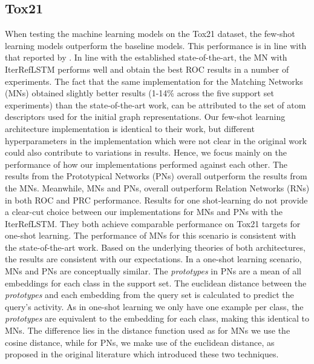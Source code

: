 \documentclass[journal=acscii,manuscript=article]{achemso}
\begin{document}
\subsection{Tox21}

When testing the machine learning models on the Tox21 dataset, the few-shot learning models outperform the baseline models. This performance is in line with that reported by \citet{altae2017low}. In line with the established state-of-the-art, the MN with IterRefLSTM performs well and obtain the best ROC results in a number of experiments. The fact that the same implementation for the Matching Networks (MNs) obtained slightly better results (1-14\% across the five support set experiments) than the state-of-the-art work, can be attributed to the set of atom descriptors used for the initial graph representations. Our few-shot learning architecture implementation is identical to their work, but different hyperparameters in the implementation which were not clear in the original work could also contribute to variations in results. Hence, we focus mainly on the performance of how our implementations performed against each other. The results from the Prototypical Networks (PNs) overall outperform the results from the MNs. Meanwhile, MNs and PNs, overall outperform Relation Networks (RNs) in both ROC and PRC performance. Results for one shot-learning do not provide a clear-cut choice between our implementations for MNs and PNs with the IterRefLSTM. They both achieve comparable performance on Tox21 targets for one-shot learning. The performance of MNs for this scenario is consistent with the state-of-the-art work. Based on the underlying theories of both architectures, the results are consistent with our expectations. In a one-shot learning scenario, MNs and PNs are conceptually similar. The \textit{prototypes} in PNs are a mean of all embeddings for each class in the support set. The euclidean distance between the \textit{prototypes} and each embedding from the query set is calculated to predict the query's activity. As in one-shot learning we only have one example per class, the \textit{prototypes} are equivalent to the embedding for each class, making this identical to MNs. The difference lies in the distance function used as for MNs we use the cosine distance, while for PNs, we make use of the euclidean distance, as proposed in the original literature which introduced these two techniques.
\end{document}
